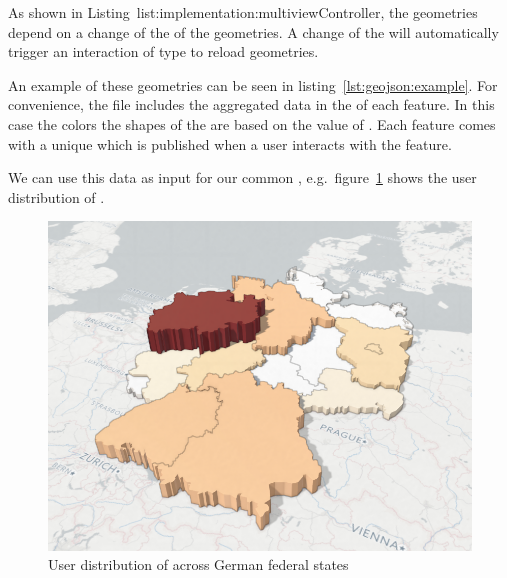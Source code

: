 

As shown in Listing~{list:implementation:multiviewController}, the geometries depend on a change of the  of the geometries.
A change of the  will automatically trigger an interaction of type  to reload geometries.

An example of these geometries can be seen in listing~\ref{lst:geojson:example}.
For convenience, the file includes the aggregated data in the  of each feature.
In this case the colors the shapes of the \tmap{} are based on the value of .
Each feature comes with a unique  which is published when a user interacts with the feature.



We can use this data as input for our common \visan{}, e.g.\ figure~\ref{fig:implementation:user_distribution} shows the user distribution of \rufu{}.

\begin{figure}[ht]
  \centering
  \includegraphics[width=\textwidth]{images/ua_example.png}
  \caption{%
    User distribution of \rufu{} across German federal states
  }\label{fig:implementation:user_distribution}
\end{figure}





